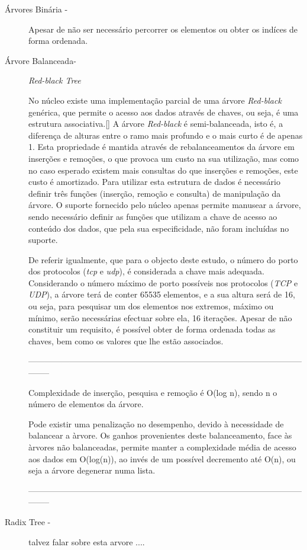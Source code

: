 \begin{description}
\item[Árvores Binária - ]
Apesar de não ser necessário percorrer os elementos ou obter os indíces de forma ordenada. 

\item[Árvore Balanceada- ]
\textit{Red-black Tree} 

No núcleo existe uma implementação parcial de uma árvore \textit{Red-black} genérica, que permite o acesso aos dados através de chaves, ou seja, é uma estrutura associativa.\ref{}
A árvore \textit{Red-black} é semi-balanceada, isto é, a diferença de alturas entre o ramo mais profundo e o mais curto é de apenas 1.
Esta propriedade é mantida através de rebalanceamentos da árvore em inserções e remoções, o que provoca um custo na sua utilização, mas como no caso esperado existem mais consultas do que inserções e remoções, este custo é amortizado.
Para utilizar esta estrutura de dados é necessário definir três funções (inserção, remoção e consulta) de manipulação da árvore.
O suporte fornecido pelo núcleo apenas permite manusear a árvore, sendo necessário definir as funções que utilizam a chave de acesso ao conteúdo dos dados, que pela sua especificidade, não foram incluídas no suporte.

De referir igualmente, que para o objecto deste estudo, o número do porto dos protocolos (\textit{tcp} e \textit{udp}), é considerada a chave mais adequada.
Considerando o número máximo de porto possíveis nos protocolos (\textit{TCP} e \textit{UDP}), a árvore terá de conter 65535 elementos, e a sua altura será de 16, ou seja, para pesquisar um dos elementos nos extremos, máximo ou mínimo, serão necessárias efectuar sobre ela, 16 iterações.
Apesar de não constituir um requisito, é possível obter de forma ordenada todas as chaves, bem como os valores que lhe estão associados.

-----------------------------------------------------------------------------------------------------------

Complexidade de inserção, pesquisa e remoção é O(log n), sendo n o número de elementos da árvore.

Pode existir uma penalização no desempenho, devido à necessidade de balancear a àrvore.
Os ganhos provenientes deste balanceamento, face às àrvores não balanceadas, permite manter a complexidade média de acesso aos dados em O(log(n)), ao invés de um possível decremento até O(n), ou seja a árvore degenerar numa lista.

-----------------------------------------------------------------------------------------------------------

\item[Radix Tree - ]
talvez falar sobre esta arvore ....

\end{description}

